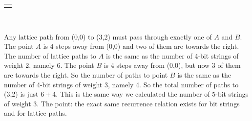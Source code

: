\documentclass[12pt,]{book}
\theoremstyle{plain}
\theoremstyle{definition}
\theoremstyle{definition}
\theoremstyle{definition}
\numberwithin{equation}{chapter}
\newlength{\panelmax}
\begin{document}
{%
\setlength{\panelmax}{0pt}
\ifdefined\panelboxAimage\else\newsavebox{\panelboxAimage}\fi%
\begin{lrbox}{\panelboxAimage}
\end{lrbox}
\ifdefined\phAimage\else\newlength{\phAimage}\fi%
\setlength{\phAimage}{\ht\panelboxAimage+\dp\panelboxAimage}
\settototalheight{\phAimage}{\usebox{\panelboxAimage}}
\setlength{\panelmax}{\maxof{\panelmax}{\phAimage}}
\leavevmode%
\setlength{\tabcolsep}{0\linewidth}
\par\medskip\noindent
\hspace*{0.3\linewidth}%
\begin{tabular}{@{}*{1}{c}@{}}
\begin{minipage}[c][\panelmax][t]{0.4\linewidth}\usebox{\panelboxAimage}\end{minipage}\end{tabular}\\
}%
\par
\hypertarget{p-844}{}%
Any lattice path from (0,0) to (3,2) must pass through exactly one of \(A\) and \(B\). The point \(A\) is 4 steps away from (0,0) and two of them are towards the right. The number of lattice paths to \(A\) is the same as the number of 4-bit strings of weight 2, namely 6. The point \(B\) is 4 steps away from (0,0), but now 3 of them are towards the right. So the number of paths to point \(B\) is the same as the number of 4-bit strings of weight 3, namely 4. So the total number of paths to (3,2) is just \(6+4\). This is the same way we calculated the number of 5-bit strings of weight 3. The point: the exact same recurrence relation exists for bit strings and for lattice paths.%
\typeout{************************************************}
\typeout{************************************************}
\end{document}

